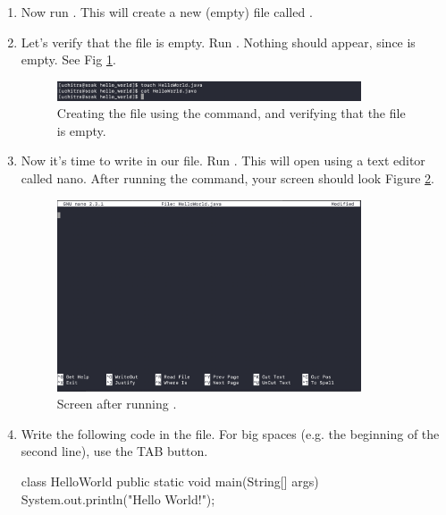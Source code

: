 \begin{enumerate}
\item Now run . This will create a new (empty) file called .

\item Let's verify that the  file is empty. Run . Nothing should appear, since  is empty. See Fig \ref{fig:linux:exercise:three}.

\begin{figure}[ht]
	\centering
	\includegraphics[width=0.85\textwidth]{images/commandLineExercise_three}
	\caption{Creating the  file using the  command, and verifying that the file is empty.}
	\label{fig:linux:exercise:three}
\end{figure}

\item Now it's time to write in our file. Run . This will open  using a text editor called nano. After running the command, your screen should look Figure \ref{fig:linux:exercise:four}.

\begin{figure}[ht]
	\centering
	\includegraphics[width=0.85\textwidth]{images/commandLineExercise_four}
	\caption{Screen after running .}
	\label{fig:linux:exercise:four}
\end{figure}

\item Write the following code in the file. For big spaces (e.g. the beginning of the second line), use the TAB button.

\begin{code}
class HelloWorld {
        public static void main(String[] args) {
                System.out.println("Hello World!");
        }
}
\end{code}


\end{enumerate}
